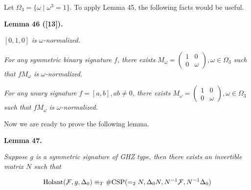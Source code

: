 \documentclass[10pt,a4paper]{article}
\begin{document}
Let $\Omega_{3}=\{\omega\mid\omega^{3}=1\}$. To apply Lemma 45, the following facts would be useful.\par





\par\medskip\noindent\textbf{
\textbf{Lemma 46}\textbf{ }([13])\textbf{.}
}\par



$[0,1,0]$\emph{ is $\omega$-normalized.}\par




\emph{For any symmetric binary signature $f$, there exists $M_{\omega}=\begin{pmatrix}1&0\\
0&\omega\end{pmatrix},\omega\in\Omega_{3}$ such that $fM_{\omega}$ is $\omega$-normalized.}\par




\emph{For any unary signature $f=[a,b],ab\neq 0$, there exists $M_{\omega}=\begin{pmatrix}1&0\\
0&\omega\end{pmatrix},\omega\in\Omega_{3}$ such that $fM_{\omega}$ is $\omega$-normalized.}\par






Now we are ready to prove the following lemma.\par





\par\medskip\noindent\textbf{
\textbf{Lemma 47}\textbf{.}
}\par



\emph{Suppose $g$ is a symmetric signature of GHZ type, then there exists an invertible matrix $N$ such that}\par


\[\begin{gathered}
\textup{{Holant}}(\mathcal{F},g,\Delta_{0})\equiv_{T}\textup{{\#CSP}}(=_{2}N,\Delta_{0}N,N^{-1}\mathcal{F},N^{-1}\Delta_{0})
\end{gathered}\]
\end{document}
